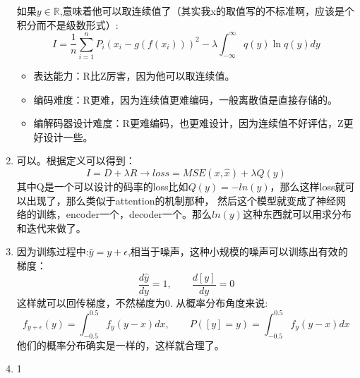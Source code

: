 \documentclass[answers]{exam}  %
\begin{document}
\begin{enumerate}[label=\alph*.]
    如果$y\in \mathbb{R}$,意味着他可以取连续值了（其实我x的取值写的不标准啊，应该是个积分而不是级数形式）:
    \begin{equation*}
        I = \frac{1}{n} \sum_{i=1}^{n} P_i\left(x_i - g(f(x_i))\right)^2 - \lambda \int_{-\infty}^{\infty}q(y) \ln q(y) dy
    \end{equation*}

    \begin{itemize}
        \item 表达能力：R比Z厉害，因为他可以取连续值。
        \item 编码难度：R更难，因为连续值更难编码，一般离散值是直接存储的。
        \item 编解码器设计难度：R更难编码，也更难设计，因为连续值不好评估，Z更好设计一些。
    \end{itemize}

    \item 可以。根据定义可以得到：
    \begin{equation*}
        I = D + \lambda R \rightarrow loss = MSE(x,\hat{x}) + \lambda Q(y)
    \end{equation*}
    其中Q是一个可以设计的码率的loss比如$Q(y) = -ln(y)$，那么这样loss就可以出现了，那么类似于attention的机制那种，
    然后这个模型就变成了神经网络的训练，encoder一个，decoder一个。那么$ln(y)$这种东西就可以用求分布和迭代来做了。
    \item 因为训练过程中:$\hat{y} = y+  \epsilon$,相当于噪声，这种小规模的噪声可以训练出有效的梯度：
    \begin{equation*}
        \frac{d \hat{y}}{dy} = 1,\qquad  \frac{d[y]}{dy} = 0
    \end{equation*}
    这样就可以回传梯度，不然梯度为0. 从概率分布角度来说:
    \begin{equation*}
        f_{y+\epsilon}(y) = \int_{-0.5}^{0.5} f_y(y-x)dx , \qquad P([y] = y) = \int_{-0.5}^{0.5} f_y(y-x)dx
    \end{equation*}
    他们的概率分布确实是一样的，这样就合理了。
    \item 1
\end{enumerate}
\end{document}
